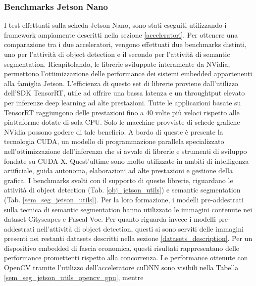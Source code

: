 \subsubsection{Benchmarks Jetson Nano}
I test effettuati sulla scheda Jetson Nano, sono stati eseguiti utilizzando i 
framework ampiamente descritti nella sezione \ref{acceleratori}. Per ottenere una comparazione 
tra i due acceleratori, vengono effettuati due benchmarks distinti, 
uno per l'attività di object detection e il secondo per l'attività di semantic segmentation.
Ricapitolando, le librerie sviluppate interamente da NVidia, 
permettono l'ottimizzazione delle performance dei sistemi embedded appartenenti 
alla famiglia Jetson. L'efficienza di questo set di librerie proviene 
dall'utilizzo dell'SDK TensorRT, utile ad offrire una bassa latenza e un 
throughtput elevato per inferenze deep learning ad alte prestazioni. Tutte 
le applicazioni basate su TensorRT raggiungono delle prestazioni fino a 
40 volte più veloci rispetto alle piattaforme dotate di sola CPU. Solo le 
macchine provviste di schede grafiche NVidia possono godere di tale beneficio. 
A bordo di queste è presente la tecnologia CUDA, un modello di 
programmazione parallela specializzato nell'ottimizzazione dell'inferenza 
che si avvale di librerie e strumenti di sviluppo fondate su CUDA-X. Quest'ultime 
sono molto utilizzate  in ambiti di intelligenza artificiale, guida 
autonoma, elaborazioni ad alte prestazioni e gestione della grafica. I benchmarks 
svolti con il supporto di queste librerie, riguardano le attività di 
object detection (Tab. \ref{obj_jetson_utils}) e semantic segmentation (Tab. \ref{sem_seg_jetson_utils}). Per la 
loro formazione, i modelli pre-addestrati sulla tecnica di semantic segmentation 
hanno utilizzato le immagini contenute nei dataset Cityscapes e Pascal 
Voc. Per quanto riguarda invece i modelli pre-addestrati nell'attività di 
object detection, questi si sono serviti delle immagini presenti nei restanti 
datasets descritti nella sezione \ref{datasets_description}. Per un dispositivo embedded di fascia 
economica, questi risultati rappresentano delle performance promettenti 
rispetto alla concorrenza. Le performance ottenute con OpenCV tramite 
l'utilizzo dell'acceleratore cuDNN sono visibili nella Tabella \ref{sem_seg_jetson_utils_opencv_gpu}, mentre 
